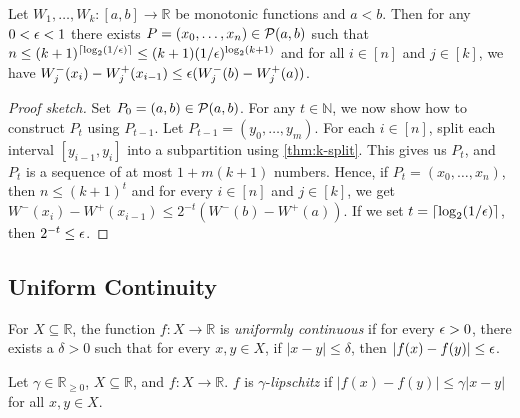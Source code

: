 \documentclass[a4paper,12pt,fleqn]{article}
\begin{document}
\begin{lemma}
\label{thm:fine-split}
Let $W_1, \ldots, W_k: [a, b] \to \mathbb{R}$ be monotonic functions and $a < b$.
Then for any $0 < \epsilon < 1$ there exists $P = (x_0, \ldots, x_n) \in \mathcal{P}(a, b)$
such that $n \le (k+1)^{\left\lceil \log_2(1/\epsilon) \right\rceil} \le (k+1)(1/\epsilon)^{\log_2(k+1)}$
and for all $i \in [n]$ and $j \in [k]$, we have
$W_j^-(x_i) - W_j^+(x_{i-1}) \le \epsilon(W_j^-(b) - W_j^+(a))$.
\end{lemma}
\begin{proof}[Proof sketch]
Set $P_0 = (a, b) \in \mathcal{P}(a, b)$. For any $t \in \mathbb{N}$,
we now show how to construct $P_t$ using $P_{t-1}$.
Let $P_{t-1} = (y_0, \ldots, y_m)$. For each $i \in [n]$,
split each interval $[y_{i-1}, y_i]$ into a subpartition using \cref{thm:k-split}.
This gives us $P_t$, and $P_t$ is a sequence of at most $1+m(k+1)$ numbers.
Hence, if $P_t = (x_0, \ldots, x_n)$, then $n \le (k+1)^t$
and for every $i \in [n]$ and $j \in [k]$, we get
$W^-(x_i) - W^+(x_{i-1}) \le 2^{-t}(W^-(b) - W^+(a))$.
If we set $t = \left\lceil \log_2(1/\epsilon) \right\rceil$, then $2^{-t} \le \epsilon$.
\end{proof}

\subsection{Uniform Continuity}

\begin{definition}
\label{defn:unif-cont}
For $X \subseteq \mathbb{R}$, the function $f: X \to \mathbb{R}$
is \emph{uniformly continuous} if
for every $\epsilon > 0$, there exists a $\delta > 0$ such that for every $x, y \in X$,
if $|x-y| \le \delta$, then $|f(x)-f(y)| \le \epsilon$.
\end{definition}

\begin{definition}
\label{defn:lipschitz}
Let $\gamma \in \mathbb{R}_{\ge 0}$, $X \subseteq \mathbb{R}$, and $f: X \to \mathbb{R}$.
$f$ is $\gamma$-\emph{lipschitz} if
$|f(x) - f(y)| \le \gamma|x - y|$ for all $x, y \in X$.
\end{definition}
\end{document}
